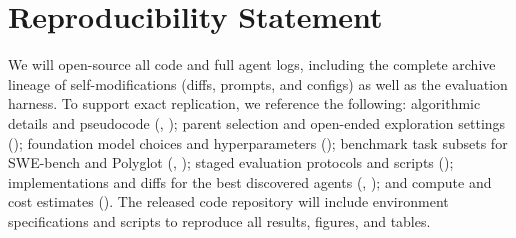 \section*{Reproducibility Statement}
We will open-source all code and full agent logs, including the complete archive lineage of self-modifications (diffs, prompts, and configs) as well as the evaluation harness. To support exact replication, we reference the following: algorithmic details and pseudocode (, ); parent selection and open-ended exploration settings (); foundation model choices and hyperparameters (); benchmark task subsets for SWE-bench and Polyglot (, ); staged evaluation protocols and scripts (); implementations and diffs for the best discovered agents (, ); and compute and cost estimates (). The released code repository will include environment specifications and scripts to reproduce all results, figures, and tables.
